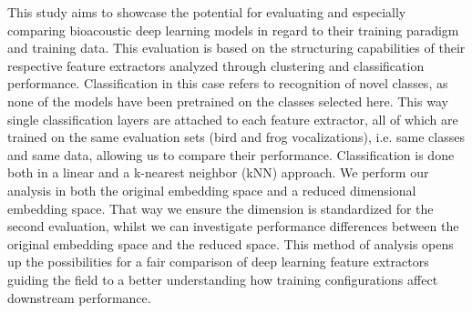 This study aims to showcase the potential for evaluating and especially comparing bioacoustic deep learning models in regard to their training paradigm and training data.
This evaluation is based on the structuring capabilities of their respective feature extractors analyzed through clustering and classification performance.
Classification in this case refers to recognition of novel classes, as none of the models have been pretrained on the classes selected here.
This way single classification layers are attached to each feature extractor, all of which are trained on the same evaluation sets (bird and frog vocalizations), i.e. same classes and same data, allowing us to compare their performance.
Classification is done both in a linear and a k-nearest neighbor (kNN) approach.
We perform our analysis in both the original embedding space and a reduced dimensional embedding space. 
That way we ensure the dimension is standardized for the second evaluation, whilst we can investigate performance differences between the original embedding space and the reduced space.
This method of analysis opens up the possibilities for a fair comparison of deep learning feature extractors guiding the field to a better understanding how training configurations affect downstream performance.




